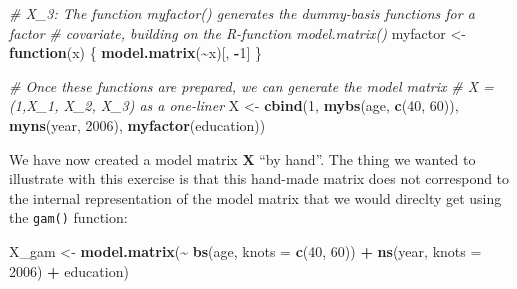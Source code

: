 \documentclass[
]{article}
\newenvironment{Shaded}{\begin{snugshade}}{\end{snugshade}}
\newcommand{\AttributeTok}[1]{\textcolor[rgb]{0.13,0.29,0.53}{#1}}
\newcommand{\CommentTok}[1]{\textcolor[rgb]{0.56,0.35,0.01}{\textit{#1}}}
\newcommand{\ControlFlowTok}[1]{\textcolor[rgb]{0.13,0.29,0.53}{\textbf{#1}}}
\newcommand{\DecValTok}[1]{\textcolor[rgb]{0.00,0.00,0.81}{#1}}
\newcommand{\FunctionTok}[1]{\textcolor[rgb]{0.13,0.29,0.53}{\textbf{#1}}}
\newcommand{\NormalTok}[1]{#1}
\newcommand{\OtherTok}[1]{\textcolor[rgb]{0.56,0.35,0.01}{#1}}
\newcommand{\SpecialCharTok}[1]{\textcolor[rgb]{0.81,0.36,0.00}{\textbf{#1}}}
\begin{document}
\begin{Shaded}
\begin{Highlighting}[]
\CommentTok{\# X\_3: The function myfactor() generates the dummy{-}basis functions for a factor}
\CommentTok{\# covariate, building on the R{-}function model.matrix()}
\NormalTok{myfactor }\OtherTok{\textless{}{-}} \ControlFlowTok{function}\NormalTok{(x) \{}
  \FunctionTok{model.matrix}\NormalTok{(}\SpecialCharTok{\textasciitilde{}}\NormalTok{x)[, }\SpecialCharTok{{-}}\DecValTok{1}\NormalTok{]}
\NormalTok{\}}

\CommentTok{\# Once these functions are prepared, we can generate the model matrix}
\CommentTok{\# X = (1,X\_1, X\_2, X\_3) as a one{-}liner}
\NormalTok{X }\OtherTok{\textless{}{-}} \FunctionTok{cbind}\NormalTok{(}\DecValTok{1}\NormalTok{, }\FunctionTok{mybs}\NormalTok{(age, }\FunctionTok{c}\NormalTok{(}\DecValTok{40}\NormalTok{, }\DecValTok{60}\NormalTok{)), }\FunctionTok{myns}\NormalTok{(year, }\DecValTok{2006}\NormalTok{), }\FunctionTok{myfactor}\NormalTok{(education))}
\end{Highlighting}
\end{Shaded}

We have now created a model matrix \(\mathbf X\) ``by hand''. The thing
we wanted to illustrate with this exercise is that this hand-made matrix
does not correspond to the internal representation of the model matrix
that we would direclty get using the \texttt{gam()} function:

\begin{Shaded}
\begin{Highlighting}[]
\NormalTok{X\_gam }\OtherTok{\textless{}{-}} \FunctionTok{model.matrix}\NormalTok{(}\SpecialCharTok{\textasciitilde{}} \FunctionTok{bs}\NormalTok{(age, }\AttributeTok{knots =} \FunctionTok{c}\NormalTok{(}\DecValTok{40}\NormalTok{, }\DecValTok{60}\NormalTok{)) }\SpecialCharTok{+}
                        \FunctionTok{ns}\NormalTok{(year, }\AttributeTok{knots =} \DecValTok{2006}\NormalTok{) }\SpecialCharTok{+}
\NormalTok{                        education)}
\end{Highlighting}
\end{Shaded}
\end{document}
